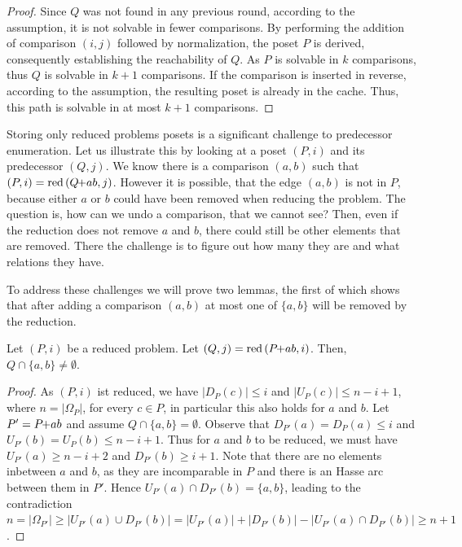\documentclass[twoside,leqno,twocolumn]{article}
\newcommand{\pchild}[3]{{#1}\kern-1pt{+}{#2}{#3}}
\newcommand{\reduced}[1]{\operatorname{red}{#1}}
\newcommand{\less}[2]{D_{#1}(#2)}
\newcommand{\greater}[2]{U_{#1}(#2)}
\begin{document}
\begin{proof} \label{proof:predecessor_calculation} %
  Since $Q$ was not found in any previous round, according to the assumption, it is not solvable in fewer comparisons. %
  By performing the addition of comparison $(i, j)$ followed by normalization, the poset $P$ is derived, consequently establishing the reachability of $Q$.
  As $P$ is solvable in $k$ comparisons, thus $Q$ is solvable in $k + 1$ comparisons.
  If the comparison is inserted in reverse, according to the assumption, the resulting poset is already in the cache.
  Thus, this path is solvable in at most $k + 1$ comparisons.
\end{proof}

Storing only reduced problems posets is a significant challenge to predecessor enumeration.
Let us illustrate this by looking at a poset $(P, i)$ and its predecessor $(Q, j)$.
We know there is a comparison $(a, b)$ such that $(P, i) = \reduced(\pchild{Q}{a}{b}, j)$.
However it is possible, that the edge $(a, b)$ is not in $P$, because either $a$ or $b$ could have been removed when reducing the problem.
The question is, how can we undo a comparison, that we cannot see?
Then, even if the reduction does not remove $a$ and $b$, there could still be other elements that are removed.
There the challenge is to figure out how many they are and what relations they have.

To address these challenges we will prove two lemmas, the first of which shows that after adding a comparison $(a, b)$ at most one of $\{a, b\}$ will be removed by the reduction.

\begin{lemma} \label{lemma:remove_only_last_element_edge}
  Let $(P, i)$ be a reduced problem.
  Let $(Q, j) = \reduced{(\pchild{P}{a}{b}, i)}$.
  Then, $Q \cap \{a ,b \} \neq \emptyset$.
\end{lemma}

\begin{proof}
  As $(P, i)$ ist reduced, we have $|\less{P}{c}| \le i$ and $|\greater{P}{c}| \le n - i + 1$, where $n = |\Omega_P|$, for every $c \in P$, in particular this also holds for $a$ and $b$.
  Let $P' = \pchild{P}{a}{b}$ and assume $Q \cap \{a ,b \} = \emptyset$.
  Observe that $\less{P'}{a} = \less{P}{a} \le i$ and $\greater{P'}{b} = \greater{P}{b} \le n - i + 1$.
  Thus for $a$ and $b$ to be reduced, we must have $\greater{P'}{a} \ge n - i + 2$ and $\less{P'}{b} \ge i + 1$.
  Note that there are no elements inbetween $a$ and $b$, as they are incomparable in $P$ and there is an Hasse arc between them in $P'$.
  Hence $\greater{P'}{a} \cap \less{P'}{b} = \{a, b\}$, leading to the contradiction $n = |\Omega_{P'}| \ge |\greater{P'}{a} \cup \less{P'}{b}| = |\greater{P'}{a}| + |\less{P'}{b}| - |\greater{P'}{a} \cap \less{P'}{b}| \ge n + 1$.
\end{proof}
\end{document}
